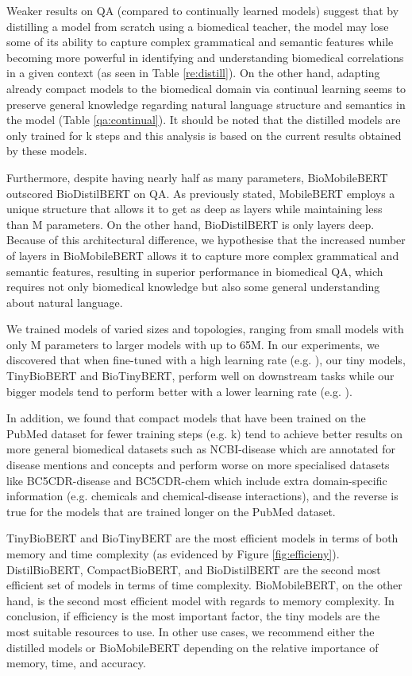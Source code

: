 \documentclass{article}
\begin{document}
Weaker results on QA (compared to continually learned models) suggest that by distilling a model from scratch using a biomedical teacher, the model may lose some of its ability to capture complex grammatical and semantic features while becoming more powerful in identifying and understanding biomedical correlations in a given context (as seen in Table \ref{re:distill}). On the other hand, adapting already compact models to the biomedical domain via continual learning seems to preserve general knowledge regarding natural language structure and semantics in the model (Table \ref{qa:continual}). It should be noted that the distilled models are only trained for k steps and this analysis is based on the current results obtained by these models.

Furthermore, despite having nearly half as many parameters, BioMobileBERT outscored BioDistilBERT on QA. As previously stated, MobileBERT employs a unique structure that allows it to get as deep as  layers while maintaining less than M parameters. On the other hand, BioDistilBERT is only  layers deep. Because of this architectural difference, we hypothesise that the increased number of layers in BioMobileBERT allows it to capture more complex grammatical and semantic features, resulting in superior performance in biomedical QA, which requires not only biomedical knowledge but also some general understanding about natural language. 

We trained models of varied sizes and topologies, ranging from small models with only M parameters to larger models with up to 65M. In our experiments, we discovered that when fine-tuned with a high learning rate (e.g. ), our tiny models, TinyBioBERT and BioTinyBERT, perform well on downstream tasks while our bigger models tend to perform better with a lower learning rate (e.g. ).

In addition, we found that compact models that have been trained on the PubMed dataset for fewer training steps (e.g. k) tend to achieve better results on more general biomedical datasets such as NCBI-disease which are annotated for disease mentions and concepts and perform worse on more specialised datasets like BC5CDR-disease and BC5CDR-chem which include extra domain-specific information (e.g. chemicals and chemical-disease interactions), and the reverse is true for the models that are trained longer on the PubMed dataset.

TinyBioBERT and BioTinyBERT are the most efficient models in terms of both memory and time complexity (as evidenced by Figure \ref{fig:efficieny}). DistilBioBERT, CompactBioBERT, and BioDistilBERT are the second most efficient set of models in terms of time complexity. BioMobileBERT, on the other hand, is the second most efficient model with regards to memory complexity. In conclusion, if efficiency is the most important factor, the tiny models are the most suitable resources to use. In other use cases, we recommend either the distilled models or BioMobileBERT depending on the relative importance of memory, time, and accuracy.
\end{document}
